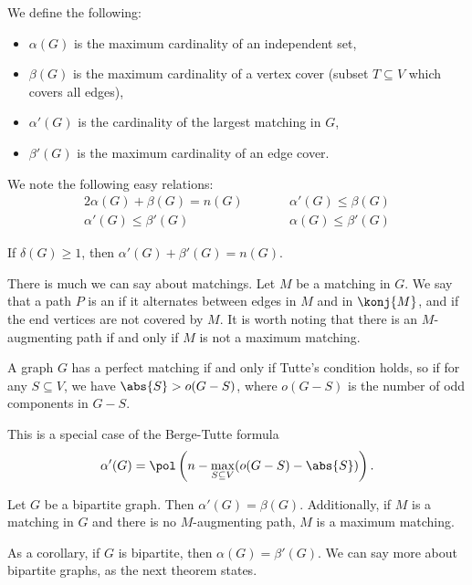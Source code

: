 
We define the following:
\begin{itemize}
\item $\alpha(G)$ is the maximum cardinality of an independent set,
\item $\beta(G)$ is the maximum cardinality of a vertex cover (subset $T
  \subseteq V$ which covers all edges),
\item $\alpha'(G)$ is the cardinality of the largest matching in $G$,
\item $\beta'(G)$ is the maximum cardinality of an edge cover.
\end{itemize}

We note the following easy relations:
\begin{alignat*}{2}
  \alpha(G) + \beta(G) = n(G) & \qquad & \alpha'(G) \le \beta(G) \\
  \alpha'(G) \le \beta'(G) & & \alpha(G) \le \beta'(G)
\end{alignat*}

\begin{theorem}[Gallai]
  If $\delta(G) \ge 1$, then $\alpha'(G) + \beta'(G) = n(G)$.
\end{theorem}

There is much we can say about matchings.
Let $M$ be a matching in $G$.
We say that a path $P$ is an  if it alternates
between edges in $M$ and in $\konj{M}$, and if the end vertices are not covered
by $M$.
It is worth noting that there is an $M$-augmenting path if and only if $M$ is
not a maximum matching.

\begin{theorem}[Tutte]
  A graph $G$ has a perfect matching if and only if Tutte's condition holds, so
  if for any $S \subseteq V$, we have $\abs{S} > o(G-S)$, where $o(G-S)$ is the
  number of odd components in $G-S$.
\end{theorem}

This is a special case of the Berge-Tutte formula
\[
  \alpha'(G) = \pol \left(n - \max_{S \subseteq V} (o(G-S) - \abs{S})\right).
\]


\begin{theorem}[König]
  Let $G$ be a bipartite graph. Then $\alpha'(G) = \beta(G)$.
  Additionally, if $M$ is a matching in $G$ and there is no $M$-augmenting path,
  $M$ is a maximum matching.
\end{theorem}

As a corollary, if $G$ is bipartite, then $\alpha(G) = \beta'(G)$.
We can say more about bipartite graphs, as the next theorem states.

